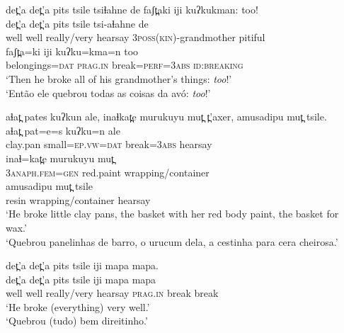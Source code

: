 \documentclass[output=paper,
modfonts,nonflat
]{langsci/langscibook}
\begin{document}
\ea det̪'a det̪'a pits tsile tsiɬahne de faʃt̪aki iji kuʔkukman: too!\\[.3em]
\gll det̪'a  det̪'a  pits             tsile        tsi-aɬahne	                de\\      
well   well    really/very  hearsay  \textsc{3poss(kin)}-grandmother  pitiful \\      



\gll faʃt̪a=ki iji          kuʔku=kma=n 	    too\\
belongings=\textsc{dat}  \textsc{prag.in} break=\textsc{perf}=\textsc{3abs}  \textsc{id:breaking}\\
\glt ‘Then he broke all of his grandmother's things: \textit{too}!'\\
‘Então ele quebrou todas as coisas da avó: \textit{too}!’
\z


\newpage 
\ea aɬat̪ pates kuʔkun ale, inaɬkat̪e murukuyu mut̪  t̪'axer, amusadipu mut̪ tsile.\\[.3em]
\gll aɬat̪  pat=e=s  kuʔku=n ale\\
clay.pan  small=\textsc{ep.vw}=\textsc{dat} break=\textsc{3abs}  hearsay\\



\gll inaɬ=kat̪e  murukuyu  mut̪\\
\textsc{3anaph.fem}=\textsc{gen}   red.paint   wrapping/container\\



\gll amusadipu mut̪  tsile\\
resin wrapping/container hearsay\\
\glt ‘He broke little clay pans, the basket with her red body paint, the basket for wax.'\\
‘Quebrou panelinhas de barro, o urucum dela, a cestinha para cera cheirosa.’{\footnotemark}
\z

\ea det̪'a det̪'a pits tsile iji mapa mapa.\\[.3em]
\gll det̪'a  det̪'a pits             tsile         iji         mapa   mapa\\
well    well   really/very  hearsay   \textsc{prag.in} break   break\\
\glt	‘He broke (everything) very well.'\\
‘Quebrou (tudo) bem direitinho.’{\footnotemark}
\z
\end{document}
